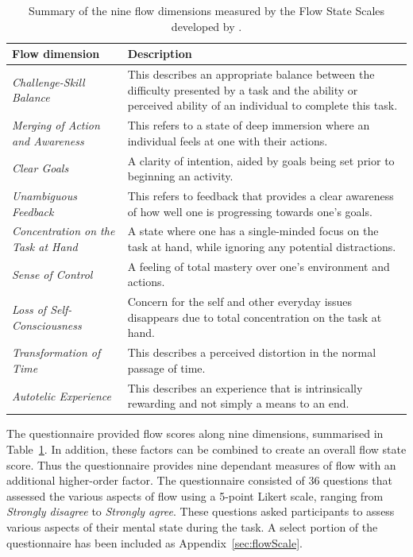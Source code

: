 \begin{table}[!ht]

\centering %
\begin{tabular*}{\textwidth}{@{\extracolsep{\fill}} p{4cm} p{11cm} }
	\hline	
	 Flow dimension & Description \\
	\hline
	\emph{Challenge-Skill Balance} & This describes an appropriate balance between the difficulty presented by a task and the ability or perceived ability of an individual to complete this task. \\ 
	\emph{Merging of Action and Awareness} & This refers to a state of deep immersion where an individual feels at one with their actions. \\
	\emph{Clear Goals} & A clarity of intention, aided by goals being set prior to beginning an activity. \\
	\emph{Unambiguous Feedback} & This refers to feedback that provides a clear awareness of how well one is progressing towards one's goals. \\
	\emph{Concentration on the Task at Hand} & A state where one has a single-minded focus on the task at hand, while ignoring any potential distractions. \\
	\emph{Sense of Control} & A feeling of total mastery over one's environment and actions. \\
	\emph{Loss of Self-Consciousness} & Concern for the self and other everyday issues disappears due to total concentration on the task at hand. \\
	\emph{Transformation of Time} & This describes a perceived distortion in the normal passage of time. \\
	\emph{Autotelic Experience} & This describes an experience that is intrinsically rewarding and not simply a means to an end. \\
	\hline
	\end{tabular*}
\caption{Summary of the nine flow dimensions measured by the Flow State Scales developed by \citet{Jack01}.}
\label {flowDimen}
\end{table}

The questionnaire provided flow scores along nine dimensions, summarised in Table~\ref{flowDimen}. In addition, these factors can be combined to create an overall flow state score. Thus the questionnaire provides nine dependant measures of flow with an additional higher-order factor. The questionnaire consisted of 36 questions that assessed the various aspects of flow using a 5-point Likert scale, ranging from \emph{Strongly disagree} to \emph{Strongly agree}. These questions asked participants to assess various aspects of their mental state during the task. A select portion of the questionnaire has been included as Appendix~\ref{sec:flowScale}.



